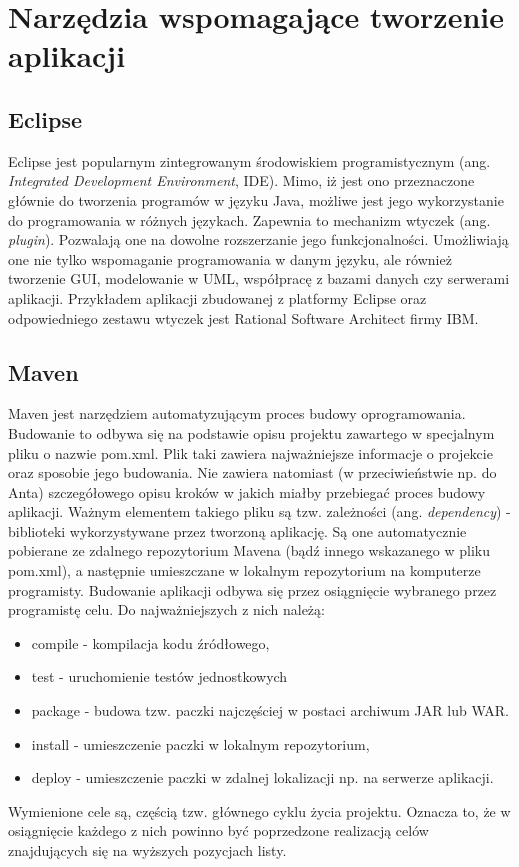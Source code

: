 \section[Narzędzia wspomagające tworzenie aplikacji][Narzędzia wspomagające tworzenie aplikacji]{Narzędzia wspomagające tworzenie aplikacji}

\subsection[Eclipse][Eclipse]{Eclipse}
Eclipse jest popularnym zintegrowanym środowiskiem programistycznym (ang. \textit{Integrated Development Environment}, IDE). Mimo, iż jest ono przeznaczone głównie do tworzenia programów w języku Java, możliwe jest jego wykorzystanie do programowania w różnych językach. Zapewnia to mechanizm wtyczek (ang. \textit{plugin}). Pozwalają one na dowolne rozszerzanie jego funkcjonalności. Umożliwiają one nie tylko wspomaganie programowania w danym języku, ale również tworzenie GUI, modelowanie w UML, współpracę z bazami danych czy serwerami aplikacji. Przykładem aplikacji zbudowanej z platformy Eclipse oraz odpowiedniego zestawu wtyczek jest Rational Software Architect firmy IBM.

\subsection[Maven][Maven]{Maven}
Maven jest narzędziem automatyzującym proces budowy oprogramowania. Budowanie to odbywa się na podstawie opisu projektu zawartego w specjalnym pliku o nazwie pom.xml. Plik taki zawiera najważniejsze informacje o projekcie oraz sposobie jego budowania. Nie zawiera natomiast (w przeciwieństwie np. do Anta) szczegółowego opisu kroków w jakich miałby przebiegać proces budowy aplikacji. Ważnym elementem takiego pliku są tzw. zależności (ang. \textit{dependency}) - biblioteki wykorzystywane przez tworzoną aplikację. Są one automatycznie pobierane ze zdalnego repozytorium Mavena (bądź innego wskazanego w pliku pom.xml), a następnie umieszczane w lokalnym repozytorium na komputerze programisty. Budowanie aplikacji odbywa się przez osiągnięcie wybranego przez programistę celu. Do najważniejszych z nich należą:
\begin{itemize}
	\item compile - kompilacja kodu źródłowego,
	\item test - uruchomienie testów jednostkowych
	\item package - budowa tzw. paczki najczęściej w postaci archiwum JAR lub WAR.
	\item install - umieszczenie paczki w lokalnym repozytorium,
	\item deploy - umieszczenie paczki w zdalnej lokalizacji np. na serwerze aplikacji.
\end{itemize}
Wymienione cele są, częścią tzw. głównego cyklu życia projektu. Oznacza to, że w osiągnięcie każdego z nich powinno być poprzedzone realizacją celów znajdujących się na wyższych pozycjach listy.

